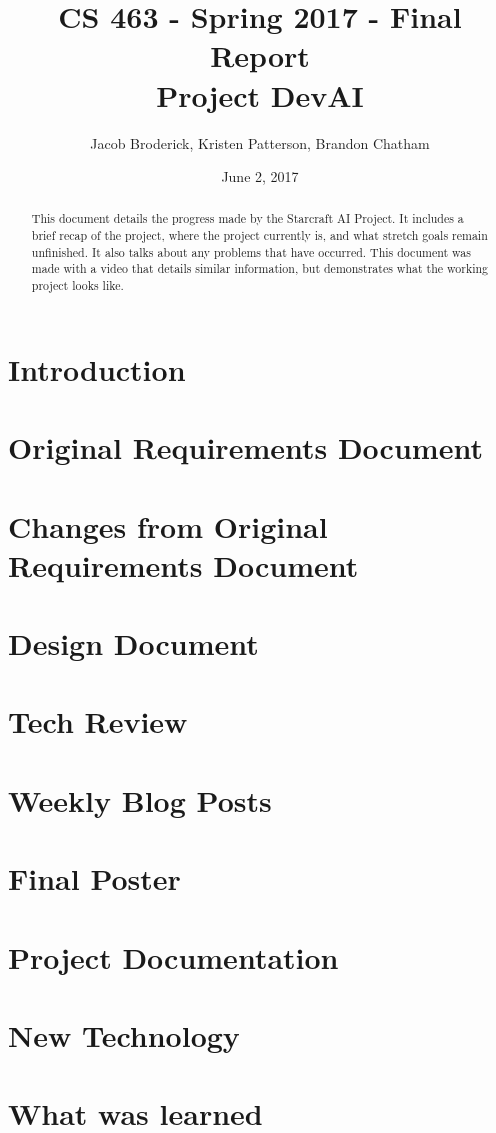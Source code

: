 \documentclass[10pt,letterpaper,onecolumn,draftclsnofoot]{IEEEtran}
\begin{document}
	
	\begin{titlepage}
		
		\title{CS 463 - Spring 2017 - Final Report \\ Project DevAI}
		\author{Jacob Broderick, Kristen Patterson, Brandon Chatham}
		\date{June 2, 2017}
		\maketitle
		\vspace{4cm}
		\begin{abstract}
			This document details the progress made by the Starcraft AI Project. It includes a brief recap of the project, where the project currently is, and what stretch goals remain unfinished. It also talks about any problems that have occurred. This document was made with a video that details similar information, but demonstrates what the working project looks like.
		\end{abstract}
	\end{titlepage}

\tableofcontents
\newpage
\section{Introduction}

\section{Original Requirements Document}

\section{Changes from Original Requirements Document}

\section{Design Document}

\section{Tech Review}

\section{Weekly Blog Posts}

\section{Final Poster}

\newpage

\section{Project Documentation}

\section{New Technology}

\section{What was learned}
\end{document}
